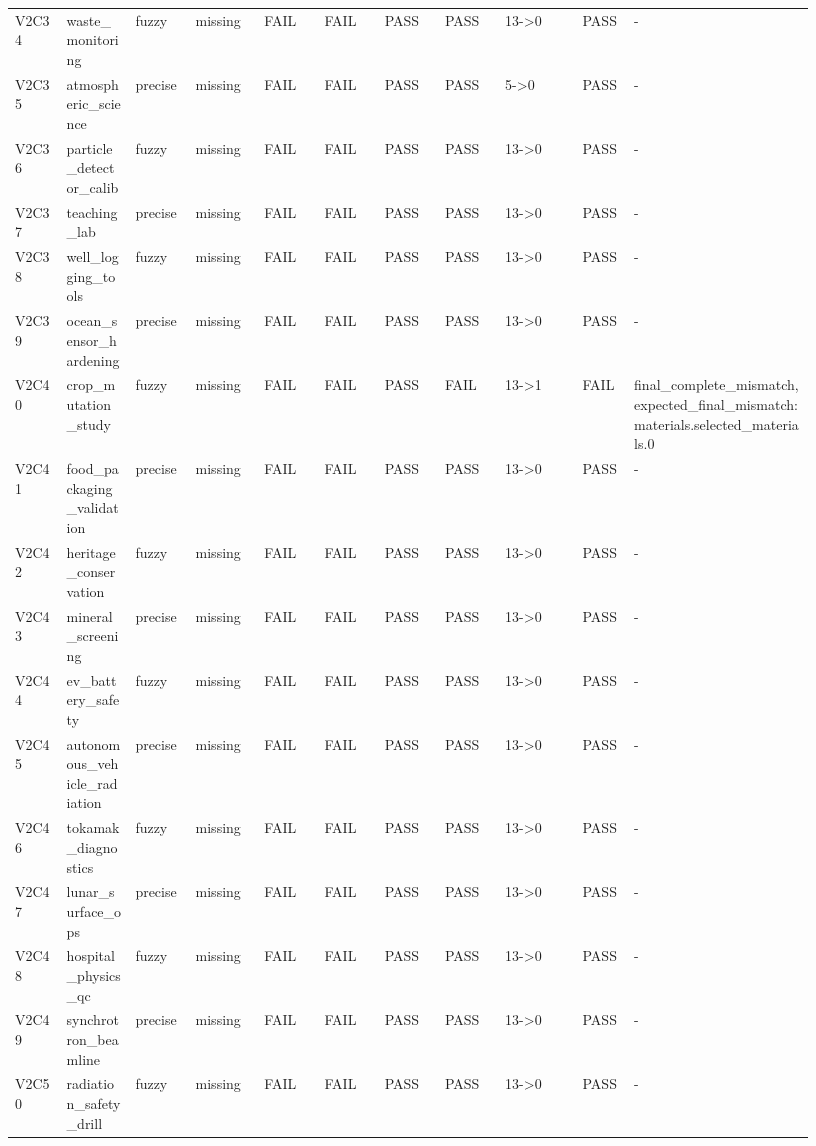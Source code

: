 \documentclass[11pt]{ctexart}
\begin{document}
\begin{longtable}{p{0.06\linewidth}p{0.08\linewidth}p{0.07\linewidth}p{0.08\linewidth}p{0.07\linewidth}p{0.07\linewidth}p{0.07\linewidth}p{0.07\linewidth}p{0.09\linewidth}p{0.06\linewidth}p{0.21\linewidth}}
V2C34 & waste\_monitoring & fuzzy & missing & FAIL & FAIL & PASS & PASS & 13->0 & PASS & - \\
V2C35 & atmospheric\_science & precise & missing & FAIL & FAIL & PASS & PASS & 5->0 & PASS & - \\
V2C36 & particle\_detector\_calib & fuzzy & missing & FAIL & FAIL & PASS & PASS & 13->0 & PASS & - \\
V2C37 & teaching\_lab & precise & missing & FAIL & FAIL & PASS & PASS & 13->0 & PASS & - \\
V2C38 & well\_logging\_tools & fuzzy & missing & FAIL & FAIL & PASS & PASS & 13->0 & PASS & - \\
V2C39 & ocean\_sensor\_hardening & precise & missing & FAIL & FAIL & PASS & PASS & 13->0 & PASS & - \\
V2C40 & crop\_mutation\_study & fuzzy & missing & FAIL & FAIL & PASS & FAIL & 13->1 & FAIL & final\_complete\_mismatch, expected\_final\_mismatch:materials.selected\_materials.0 \\
V2C41 & food\_packaging\_validation & precise & missing & FAIL & FAIL & PASS & PASS & 13->0 & PASS & - \\
V2C42 & heritage\_conservation & fuzzy & missing & FAIL & FAIL & PASS & PASS & 13->0 & PASS & - \\
V2C43 & mineral\_screening & precise & missing & FAIL & FAIL & PASS & PASS & 13->0 & PASS & - \\
V2C44 & ev\_battery\_safety & fuzzy & missing & FAIL & FAIL & PASS & PASS & 13->0 & PASS & - \\
V2C45 & autonomous\_vehicle\_radiation & precise & missing & FAIL & FAIL & PASS & PASS & 13->0 & PASS & - \\
V2C46 & tokamak\_diagnostics & fuzzy & missing & FAIL & FAIL & PASS & PASS & 13->0 & PASS & - \\
V2C47 & lunar\_surface\_ops & precise & missing & FAIL & FAIL & PASS & PASS & 13->0 & PASS & - \\
V2C48 & hospital\_physics\_qc & fuzzy & missing & FAIL & FAIL & PASS & PASS & 13->0 & PASS & - \\
V2C49 & synchrotron\_beamline & precise & missing & FAIL & FAIL & PASS & PASS & 13->0 & PASS & - \\
V2C50 & radiation\_safety\_drill & fuzzy & missing & FAIL & FAIL & PASS & PASS & 13->0 & PASS & - \\
\bottomrule
\end{longtable}
\end{document}
